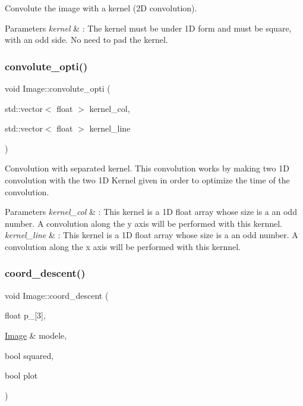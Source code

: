 Convolute the image with a kernel (2D convolution). 


\begin{DoxyParams}{Parameters}
{\em kernel} & \+: The kernel must be under 1D form and must be square, with an odd side. No need to pad the kernel. \\
\hline
\end{DoxyParams}
\mbox{\label{class_image_ada95b6ea97ecf58ef3d0e2d7e6c3c8e2}} 
\subsubsection{\texorpdfstring{convolute\+\_\+opti()}{convolute\_opti()}}
{\footnotesize\ttfamily void Image\+::convolute\+\_\+opti (\begin{DoxyParamCaption}\item[{std\+::vector$<$ float $>$}]{kernel\+\_\+col,  }\item[{std\+::vector$<$ float $>$}]{kernel\+\_\+line }\end{DoxyParamCaption})}



Convolution with separated kernel. This convolution works by making two 1D convolution with the two 1D Kernel given in order to optimize the time of the convolution. 


\begin{DoxyParams}{Parameters}
{\em kernel\+\_\+col} & \+: This kernel is a 1D float array whose size is a an odd number. A convolution along the y axis will be performed with this kernnel. \\
\hline
{\em kernel\+\_\+line} & \+: This kernel is a 1D float array whose size is a an odd number. A convolution along the x axis will be performed with this kernnel. \\
\hline
\end{DoxyParams}
\mbox{\label{class_image_aafaf002c76afadb1241bb3b2bca8b097}} 
\subsubsection{\texorpdfstring{coord\+\_\+descent()}{coord\_descent()}}
{\footnotesize\ttfamily void Image\+::coord\+\_\+descent (\begin{DoxyParamCaption}\item[{float}]{p\+\_\mbox{[}3\mbox{]},  }\item[{\hyperlink{class_image}{Image} \&}]{modele,  }\item[{bool}]{squared,  }\item[{bool}]{plot }\end{DoxyParamCaption})}



